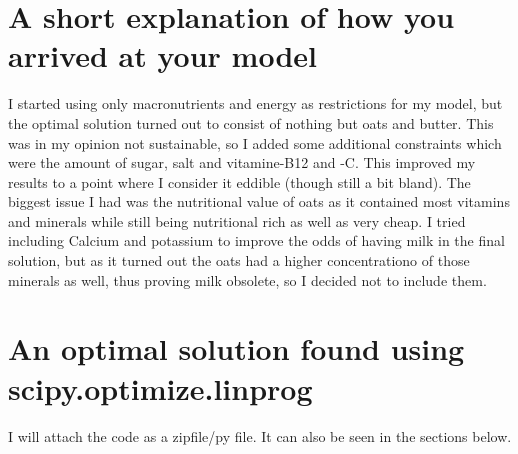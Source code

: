 \documentclass[margin=0.3in]{article}
\begin{document}
\section{A short explanation of how you arrived at your model}
\label{sec-2}
I started using only macronutrients and energy as restrictions for my model, but the optimal solution turned out to consist of nothing but oats and butter. This was in my opinion not sustainable, so I added some additional constraints which were the amount of sugar, salt and vitamine-B12 and -C. This improved my results to a point where I consider it eddible (though still a bit bland). The biggest issue I had was the nutritional value of oats as it contained most vitamins and minerals while still being nutritional rich as well as very cheap. I tried including Calcium and potassium to improve the odds of having milk in the final solution, but as it turned out the oats had a higher concentrationo of those minerals as well, thus proving milk obsolete, so I decided not to include them.

\section{An optimal solution found using scipy.optimize.linprog}
\label{sec-3}
I will attach the code as a zipfile/py file. It can also be seen in the sections below.
\end{document}
